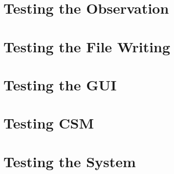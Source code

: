 		\section{Testing the Observation}
			
			
		\section{Testing the File Writing}
			
		\section{Testing the GUI}
			
		\section{Testing CSM}
			
		\section{Testing the System}
				
